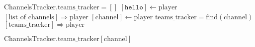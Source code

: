 \documentclass{article}
\begin{document}
\pagestyle{empty}

\newcommand{\send}{\Rightarrow}
\newcommand{\sendto}{\rightarrow}
\algrenewcommand\textproc{\textrm}

\begin{algorithmic}
  \algrenewcommand{}
  \algrenewcommand{}
  \State $\text{ChannelsTracker}.\text{teams\_tracker}=[]$
  \State $[\mathtt{hello}] \gets \text{player}$
  \State $[\text{list\_of\_channels}] \send \text{player}$
  \State $[\text{channel}] \gets \text{player}$
  \State $\text{teams\_tracker} = \text{find}(\text{channel})$
  \State $[\text{teams\_tracker}] \send \text{player}$
  \EndWhile
  \EndProcedure

  \State \Return $\text{ChannelsTracker}.\text{teams\_tracker}[\text{channel}]$
  \EndFunction
  
  \EndProcedure
\end{algorithmic}
\end{document}
